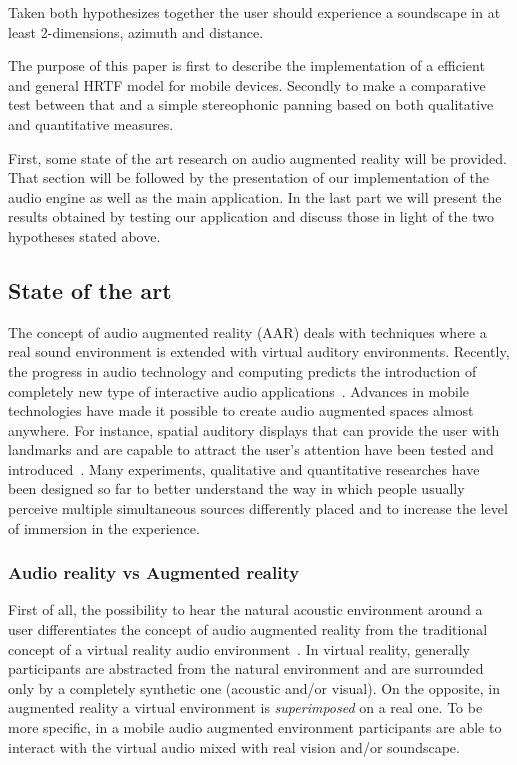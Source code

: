 \documentclass[journal]{IEEEtran}
\begin{document}
Taken both hypothesizes together the user should experience a soundscape in at least 2-dimensions, azimuth and distance.

The purpose of this paper is first to describe the implementation of a efficient and general HRTF model for mobile devices. Secondly to make a comparative test between that and a simple stereophonic panning based on both qualitative and quantitative measures. 

First, some state of the art research on audio augmented reality will be provided. That section will be followed by the presentation of our implementation of the audio engine as well as the main application. In the last part we will present the results obtained by testing our application and discuss those in light of the two hypotheses stated above.



\subsection{State of the art}
The concept of audio augmented reality (AAR) deals with techniques where a real sound environment is extended with virtual auditory environments. Recently, the progress in audio technology and computing predicts the introduction of completely new type of interactive audio applications~\cite{}. Advances in mobile technologies have made it possible to create audio augmented spaces almost anywhere. For instance, spatial auditory displays that can provide the user with landmarks and are capable to attract the user's attention have been tested and introduced~\cite{}. Many experiments, qualitative and quantitative researches have been designed so far to better understand the way in which people usually perceive multiple simultaneous sources differently placed and to increase the level of immersion in the experience.

\subsubsection{Audio reality vs Augmented reality}
First of all, the possibility to hear the natural acoustic environment around a user differentiates the concept of audio augmented reality from the traditional concept of a virtual reality audio environment~\cite{}. In virtual reality, generally participants are abstracted from the natural environment and are surrounded only by a completely synthetic one (acoustic and/or visual). On the opposite, in augmented reality a virtual environment is \emph{superimposed} on a real one. To be more specific, in a mobile audio augmented environment participants are able to interact with the virtual audio mixed with real vision and/or soundscape.
\end{document}
